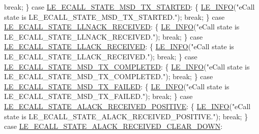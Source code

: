 \begin{DoxyCodeInclude}
{{{{{{{{            \textcolor{keywordflow}{break};
        \}
        \textcolor{keywordflow}{case} \hyperlink{le__ecall__interface_8h_a233609e4724e549a1405f9177c0a07dda0e8c495854c6fe3f9fe9285554704572}{LE\_ECALL\_STATE\_MSD\_TX\_STARTED}:
        \{
            \hyperlink{le__log_8h_a23e6d206faa64f612045d688cdde5808}{LE\_INFO}(\textcolor{stringliteral}{"eCall state is LE\_ECALL\_STATE\_MSD\_TX\_STARTED."});
            \textcolor{keywordflow}{break};
        \}
        \textcolor{keywordflow}{case} \hyperlink{le__ecall__interface_8h_a233609e4724e549a1405f9177c0a07dda8699c87772e74835e38573fc9830dba5}{LE\_ECALL\_STATE\_LLNACK\_RECEIVED}:
        \{
            \hyperlink{le__log_8h_a23e6d206faa64f612045d688cdde5808}{LE\_INFO}(\textcolor{stringliteral}{"eCall state is LE\_ECALL\_STATE\_LLNACK\_RECEIVED."});
            \textcolor{keywordflow}{break};
        \}
        \textcolor{keywordflow}{case} \hyperlink{le__ecall__interface_8h_a233609e4724e549a1405f9177c0a07dda0410bf309197a2f26910062efb56ed0e}{LE\_ECALL\_STATE\_LLACK\_RECEIVED}:
        \{
            \hyperlink{le__log_8h_a23e6d206faa64f612045d688cdde5808}{LE\_INFO}(\textcolor{stringliteral}{"eCall state is LE\_ECALL\_STATE\_LLACK\_RECEIVED."});
            \textcolor{keywordflow}{break};
        \}
        \textcolor{keywordflow}{case} \hyperlink{le__ecall__interface_8h_a233609e4724e549a1405f9177c0a07ddae9346b115da82c9583f057ba12d8faa9}{LE\_ECALL\_STATE\_MSD\_TX\_COMPLETED}:
        \{
            \hyperlink{le__log_8h_a23e6d206faa64f612045d688cdde5808}{LE\_INFO}(\textcolor{stringliteral}{"eCall state is LE\_ECALL\_STATE\_MSD\_TX\_COMPLETED."});
            \textcolor{keywordflow}{break};
        \}
        \textcolor{keywordflow}{case} \hyperlink{le__ecall__interface_8h_a233609e4724e549a1405f9177c0a07dda3654bda55c075297e9111acafa90a2bb}{LE\_ECALL\_STATE\_MSD\_TX\_FAILED}:
        \{
            \hyperlink{le__log_8h_a23e6d206faa64f612045d688cdde5808}{LE\_INFO}(\textcolor{stringliteral}{"eCall state is LE\_ECALL\_STATE\_MSD\_TX\_FAILED."});
            \textcolor{keywordflow}{break};
        \}
        \textcolor{keywordflow}{case} \hyperlink{le__ecall__interface_8h_a233609e4724e549a1405f9177c0a07dda5a54611736c5cf7131cc196c694d8060}{LE\_ECALL\_STATE\_ALACK\_RECEIVED\_POSITIVE}:
        \{
            \hyperlink{le__log_8h_a23e6d206faa64f612045d688cdde5808}{LE\_INFO}(\textcolor{stringliteral}{"eCall state is LE\_ECALL\_STATE\_ALACK\_RECEIVED\_POSITIVE."});
            \textcolor{keywordflow}{break};
        \}
        \textcolor{keywordflow}{case} \hyperlink{le__ecall__interface_8h_a233609e4724e549a1405f9177c0a07dda2b28ed16149c54b6b3d9c57dea4a748f}{LE\_ECALL\_STATE\_ALACK\_RECEIVED\_CLEAR\_DOWN}:
}}}}}}}}
\end{DoxyCodeInclude}
